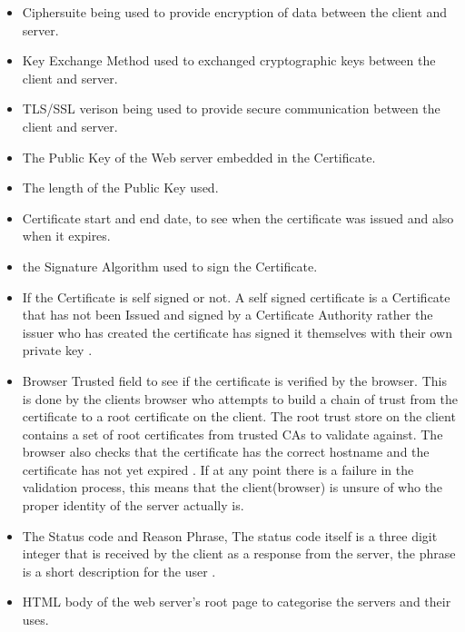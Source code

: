 \documentclass[a4wide,leqno,12pt]{report}
\begin{document}
\begin{itemize}
  \item Ciphersuite being used to provide encryption of data between the client and server.
  \item Key Exchange Method used to exchanged cryptographic keys between the client and server.
  \item TLS/SSL verison being used to provide secure communication between the client and server.
  \item The Public Key of the Web server embedded in the Certificate.
  \item The length of the Public Key used.
  \item Certificate start and end date, to see when the certificate was issued and also when it expires.
  \item the Signature Algorithm used to sign the Certificate.
  \item If the Certificate is self signed or not.
  A self signed certificate is a Certificate that has not been Issued and signed by a Certificate Authority rather the issuer who has created the certificate has signed it themselves with their own private key \cite{housley1998internet}.
  \item Browser Trusted field to see if the certificate is verified by the browser. This is done by the clients browser who attempts to build a chain of trust from the certificate to a root certificate on the client. The root trust store on the client contains a set of root certificates from trusted CAs to validate against. The browser also checks that the certificate has the correct hostname and the certificate has not yet expired \cite{acer2017wild}. If at any point there is a failure in the validation process, this means that the client(browser) is unsure of who the proper identity of the server actually is. 
  \item The Status code and Reason Phrase, The status code itself is a three digit integer that is received by the client as a response from the server, the phrase is a short description for the user \cite{fielding1999hypertext} \cite{berners1996hypertext}.
  \item HTML body of the web server's root page to categorise the servers and their uses.

\end{itemize}
\end{document}
